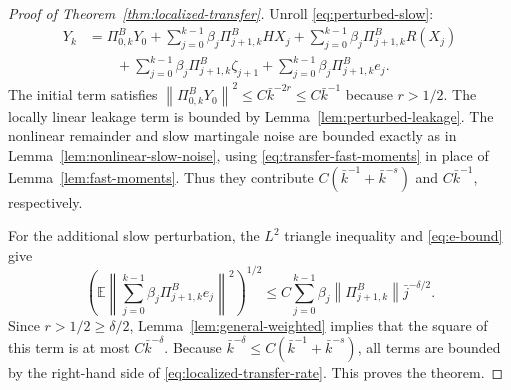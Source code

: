 \documentclass{article}
\newcommand{\E}{\mathbb{E}}
\newcommand{\norm}[1]{\left\lVert #1\right\rVert}
\begin{document}
\begin{proof}[Proof of Theorem~\ref{thm:localized-transfer}]
Unroll \eqref{eq:perturbed-slow}:
\begin{align*}
  Y_k
  &=\Pi^B_{0,k}Y_0
    +\sum_{j=0}^{k-1}\beta_j\Pi^B_{j+1,k}HX_j
    +\sum_{j=0}^{k-1}\beta_j\Pi^B_{j+1,k}R(X_j)\\
  &\qquad
    +\sum_{j=0}^{k-1}\beta_j\Pi^B_{j+1,k}\zeta_{j+1}
    +\sum_{j=0}^{k-1}\beta_j\Pi^B_{j+1,k}e_j.
\end{align*}
The initial term satisfies $\norm{\Pi^B_{0,k}Y_0}^2\le C\bar k^{-2r}\le C\bar k^{-1}$ because $r>1/2$. The locally linear leakage term is bounded by Lemma~\ref{lem:perturbed-leakage}. The nonlinear remainder and slow martingale noise are bounded exactly as in Lemma~\ref{lem:nonlinear-slow-noise}, using \eqref{eq:transfer-fast-moments} in place of Lemma~\ref{lem:fast-moments}. Thus they contribute $C(\bar k^{-1}+\bar k^{-s})$ and $C\bar k^{-1}$, respectively.

For the additional slow perturbation, the $L^2$ triangle inequality and \eqref{eq:e-bound} give
\[
  \left(\E\left\|\sum_{j=0}^{k-1}\beta_j\Pi^B_{j+1,k}e_j\right\|^2\right)^{1/2}
  \le C\sum_{j=0}^{k-1}\beta_j\norm{\Pi^B_{j+1,k}}\bar j^{-\delta/2}.
\]
Since $r>1/2\ge\delta/2$, Lemma~\ref{lem:general-weighted} implies that the square of this term is at most $C\bar k^{-\delta}$. Because $\bar k^{-\delta}\le C(\bar k^{-1}+\bar k^{-s})$, all terms are bounded by the right-hand side of \eqref{eq:localized-transfer-rate}. This proves the theorem.
\end{proof}
\end{document}
